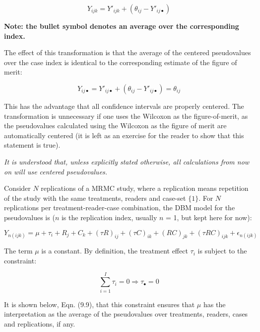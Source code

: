 \documentclass[
]{book}
\begin{document}
\begin{equation}
Y_{ijk}=Y'_{ijk}+\left (\theta_{ij} - Y'_{ij\bullet}  \right )
\label{eq:pValCentered}
\end{equation}

\textbf{Note: the bullet symbol denotes an average over the corresponding index.}

The effect of this transformation is that the average of the centered pseudovalues over the case index is identical to the corresponding estimate of the figure of merit:

\begin{equation}
Y_{ij\bullet}=Y'_{ij\bullet}+\left (\theta_{ij} - Y'_{ij\bullet}  \right )=\theta_{ij}
\label{eq:EffectOfCentering}
\end{equation}

This has the advantage that all confidence intervals are properly centered. The transformation is unnecessary if one uses the Wilcoxon as the figure-of-merit, as the pseudovalues calculated using the Wilcoxon as the figure of merit are automatically centered (it is left as an exercise for the reader to show that this statement is true).

\emph{It is understood that, unless explicitly stated otherwise, all calculations from now on will use centered pseudovalues.}

Consider \(N\) replications of a MRMC study, where a replication means repetition of the study with the same treatments, readers and case-set \(\{1\}\). For \(N\) replications per treatment-reader-case combination, the DBM model for the pseudovalues is (\(n\) is the replication index, usually \(n\) = 1, but kept here for now):

\begin{equation}
Y_{n(ijk)}  = \mu + \tau_i+ R_j + C_k + (\tau R)_{ij}+ (\tau C)_{ik}+ (R C)_{jk} + (\tau RC)_{ijk}+ \epsilon_{n(ijk)} 
\label{eq:SamplingDbmModel}
\end{equation}

The term \(\mu\) is a constant. By definition, the treatment effect \(\tau_i\) is subject to the constraint:

\begin{equation}
\sum_{i=1}^{I}\tau_i=0\Rightarrow \tau_\bullet=0
\label{eq:constraintTau}
\end{equation}

It is shown below, Eqn. (9.9), that this constraint ensures that \(\mu\) has the interpretation as the average of the pseudovalues over treatments, readers, cases and replications, if any.
\end{document}
